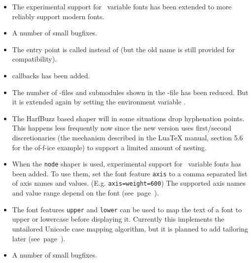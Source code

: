 \begin{itemize}
  \item The experimental support for \OpenType\ variable fonts has been extended
    to more reliably support modern fonts.
  \item A number of small bugfixes.
 \end{itemize}
\endsubsection

\begin{itemize}
  \item The entry point is called  instead of
      (but the old name is still provided for compatibility).
  \item  {} callbacks has been added.
  \item  The number of -files and submodules shown in the -file has been reduced. But it
   is extended again by setting the environment variable .
  \item The HarfBuzz based shaper will in some situations drop hyphenation
   points. This happens less frequently now since the new version uses
   first/second discretionaries (the mechanism described in the LuaTeX manual,
   section 5.6 for the of-f-ice example) to support a limited amount of
   nesting.
  \item When the \texttt{node} shaper is used, experimental support for \OpenType\ variable
   fonts has been added. To use them, set the font feature \texttt{axis} to
   a comma separated list of axis names and values. (E.g.  \texttt{axis={weight=600}})
   The supported axis names and value range depend on the font (see~page~\pageref{variablefonts}).
 \item The font features \texttt{upper} and \texttt{lower} can be used to map
   the text of a font to upper or lowercase before displaying it. Currently
   this implements the untailored Unicode case mapping algorithm, but it is
   planned to add tailoring later (see~page~\pageref{upperlower}).
  \item A number of small bugfixes.
 \end{itemize}
\endsubsection

